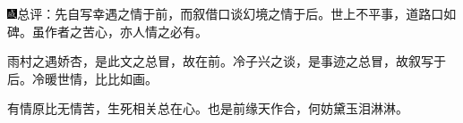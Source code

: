 {\includegraphics[width=3mm]{../Images/00005}总评：先自写幸遇之情于前，而叙借口谈幻境之情于后。世上不平事，道路口如碑。虽作者之苦心，亦人情之必有。}

{雨村之遇娇杏，是此文之总冒，故在前。冷子兴之谈，是事迹之总冒，故叙写于后。冷暖世情，比比如画。}

{有情原比无情苦，生死相关总在心。也是前缘天作合，何妨黛玉泪淋淋。}

%
%

